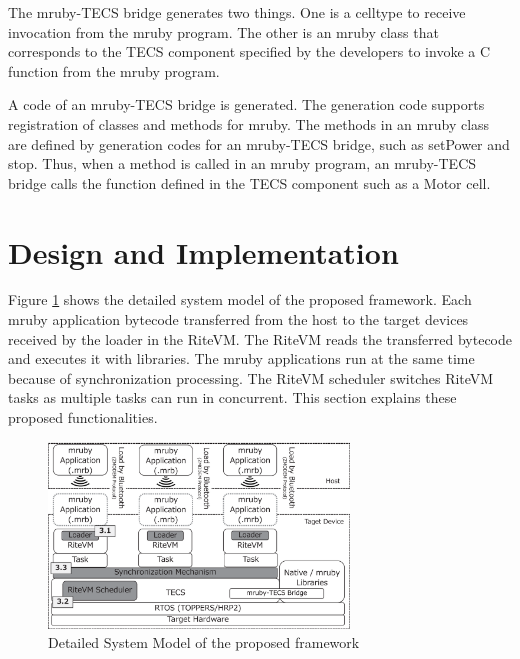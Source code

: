 \documentclass{sig-alternate-05-2015}
\begin{document}
The mruby-TECS bridge generates two things.
One is a {\myit celltype} to receive invocation from the mruby program.
The other is an mruby class that corresponds to the TECS component specified by the developers to invoke a C function from the mruby program.

A code of an mruby-TECS bridge is generated.
The generation code supports registration of classes and methods for mruby.
The methods in an mruby class are defined by generation codes for an mruby-TECS bridge, such as setPower and stop.
Thus, when a method is called in an mruby program, an mruby-TECS bridge calls the function defined in the TECS component such as a Motor {\myit cell}.

\section{Design and Implementation}
\label{sec:Design and Implementation}
Figure \ref{fig:system_model} shows the detailed system model of the proposed framework.
Each mruby application bytecode transferred from the host to the target devices received by the loader in the RiteVM.
The RiteVM reads the transferred bytecode and executes it with libraries.
The mruby applications run at the same time because of synchronization processing.
The RiteVM scheduler switches RiteVM tasks as multiple tasks can run in concurrent.
This section explains these proposed functionalities.

\begin{figure}[t]
    \centering
    \includegraphics[width=8cm,clip]{figure/system_model.eps}
    \vspace{1mm}
\caption{Detailed System Model of the proposed framework}
    \vspace{1mm}
\label{fig:system_model}
\end{figure}
\end{document}
